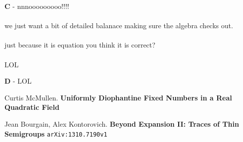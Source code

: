 \documentclass[12pt]{article}
\begin{document}
\newpage

\noindent \textbf{C} - nnnooooooooo!!!! \\ \\
we just want a bit of detailed balanace making sure the algebra checks out. \\ \\
just because it is equation you think it is correct? 
\\ \\ LOL

\newpage

\noindent \textbf{D} - LOL

\newpage

\selectfont \fontsize{12}{10}\selectfont

\begin{thebibliography}{}

\item Curtis McMullen.  \textbf{Uniformly Diophantine Fixed Numbers in a Real Quadratic Field}

\item Jean Bourgain, Alex Kontorovich.
\textbf{Beyond Expansion II: Traces of Thin Semigroups} \texttt{arXiv:1310.7190v1}

\end{thebibliography}
\end{document}
